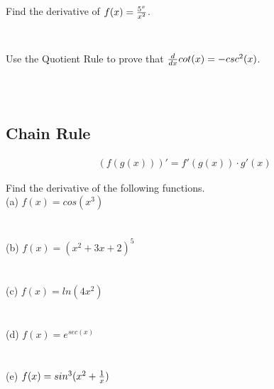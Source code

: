 \begin{exercise}\nonumber
    Find the derivative of $ f(x) = {5^x \over x^2} $.

    \begin{align}
        \\
        \\
    \end{align}
\end{exercise}

\begin{exercise}\nonumber
    Use the Quotient Rule to prove that $ {d \over dx}cot(x) = -csc^2(x) $.

    \begin{align}
        \\
        \\
        \\
        \\
        \\
    \end{align}
\end{exercise}

\subsection{Chain Rule}

\begin{theorem}
    \begin{align}
        (f(g(x)))' = f'(g(x)) \cdot g'(x)
    \end{align}
\end{theorem}

\begin{exercise}\nonumber
    Find the derivative of the following functions. \\

    (a) $ f(x) = cos(x^3) $
    \\
    \\
    \\

    (b) $ f(x) = (x^2 + 3x + 2)^5 $
    \\
    \\
    \\

    (c) $ f(x) = ln(4x^2) $
    \\
    \\
    \\

    (d) $ f(x) = e^{sec(x)} $
    \\
    \\
    \\

    (e) $ f(x) = sin^3(x^2 + {1 \over x}) $
    \\
    \\
    \\
\end{exercise}

